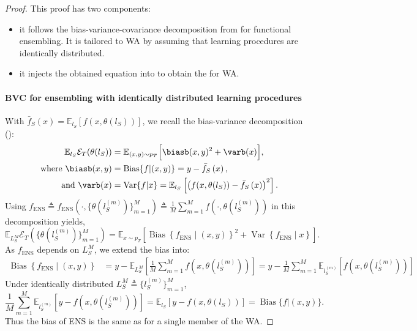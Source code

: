 \begin{proof}
    This proof has two components:
    \begin{itemize}
        \item it follows the bias-variance-covariance decomposition from \cite{ueda1996generalization,brown2005between} for functional ensembling. It is tailored to WA by assuming that learning procedures are identically distributed.
        \item it injects the obtained equation into  to obtain the  for WA.
    \end{itemize}
    \paragraph{BVC for ensembling with identically distributed learning procedures}
    With $\bar{f}_S\left(x\right) = \mathbb{E}_{l_S} \left[f\left(x,\theta\left(l_S\right)\right)\right]$, we recall the bias-variance decomposition \cite{kohavi1996bias} ():
    \begin{align*}
        \mathbb{E}_{l_S}\mathcal{E}_T(\theta(l_S)) & = \mathbb{E}_{(x,y)\sim p_T}\Big[\biasb(x,y)^{2}+\varb(x)\Big],\\
        \text{where~}\biasb(x,y) & =  \operatorname{Bias}\{f|(x,y)\} = y-\bar{f}_S\left(x\right), \\
        \text{and~}\varb(x) &= \operatorname{Var}\{f|x\} = \mathbb{E}_{l_S}\left[\left(f(x, \theta(l_S)) - \bar{f}_S\left(x\right)\right)^{2}\right]. \\
    \end{align*}
    Using $f_{\text{ENS}}\triangleq f_{\text{ENS}}(\cdot, \{\theta(l_S^{(m)})\}_{m=1}^M) \triangleq \frac{1}{M} \sum_{m=1}^{M} f(\cdot, \theta(l_S^{(m)}))$ in this decomposition yields,
    \begin{equation} \label{eq:b_v_ens}
        \mathbb{E}_{L_S^M}\mathcal{E}_T(\{\theta(l_S^{(m)})\}_{m=1}^M)=\mathbb{E}_{x\sim p_T}\left[\operatorname{Bias}\left\{f_{\text{ENS}} \mid (x,y)\right\}^{2}+\operatorname{Var}\left\{f_{\text{ENS}} \mid x\right\}\right].
    \end{equation}
    As $f_{\text{ENS}}$ depends on $L_S^M$, we extend the bias into:
    \begin{align*}
        \operatorname{Bias}\left\{f_{\text{ENS}} \mid (x,y)\right\}&=y-\mathbb{E}_{L_S^M}\left[\frac{1}{M} \sum_{m=1}^{M} f(x, \theta(l_S^{(m)}))\right]=y-\frac{1}{M} \sum_{m=1}^{M} \mathbb{E}_{l_S^{(m)}}\left[f(x, \theta(l_S^{(m)}))\right]
    \end{align*}
    Under identically distributed $L_S^M\triangleq\{l_S^{(m)}\}_{m=1}^M$,
    $$
        \frac{1}{M} \sum_{m=1}^{M} \mathbb{E}_{l_S^{(m)}}\left[y-f(x, \theta(l_S^{(m)}))\right]=\mathbb{E}_{l_S}\left[y-f(x, \theta(l_S))\right]=\operatorname{Bias}\{f|(x,y)\}.
    $$
    Thus the bias of ENS is the same as for a single member of the WA.
    

\end{proof}
